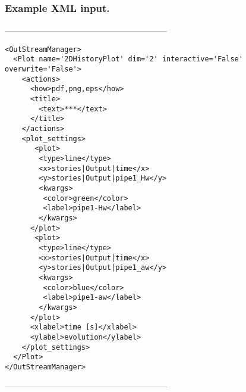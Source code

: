 \subsubsection{Example XML input.}
-----------------------------------------------------------
\begin{lstlisting}[style=XML]
<OutStreamManager>
  <Plot name='2DHistoryPlot' dim='2' interactive='False' overwrite='False'>
    <actions>
      <how>pdf,png,eps</how>
      <title>
        <text>***</text>
      </title>
    </actions>
    <plot_settings>
       <plot>
        <type>line</type>
        <x>stories|Output|time</x>
        <y>stories|Output|pipe1_Hw</y> 
        <kwargs>
         <color>green</color>
         <label>pipe1-Hw</label>
        </kwargs>
      </plot>
       <plot>
        <type>line</type>
        <x>stories|Output|time</x>
        <y>stories|Output|pipe1_aw</y> 
        <kwargs>
         <color>blue</color>
         <label>pipe1-aw</label>
        </kwargs>
      </plot>
      <xlabel>time [s]</xlabel>
      <ylabel>evolution</ylabel>
    </plot_settings>
  </Plot>
</OutStreamManager>
\end{lstlisting}
-----------------------------------------------------------










